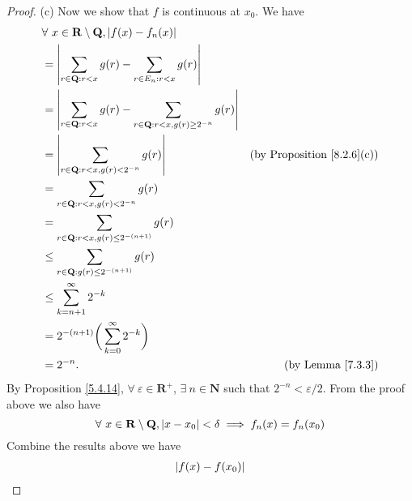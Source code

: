 \begin{proof}{(c)}
    Now we show that \(f\) is continuous at \(x_0\).
    We have
    \begin{align*}
         & \forall\ x \in \mathbf{R} \setminus \mathbf{Q}, \abs*{f(x) - f_n(x)}                                                                            \\
         & = \abs*{\sum_{r \in \mathbf{Q} : r < x} g(r) - \sum_{r \in E_n : r < x} g(r)}                                                                   \\
         & = \abs*{\sum_{r \in \mathbf{Q} : r < x} g(r) - \sum_{r \in \mathbf{Q} : r < x, g(r) \geq 2^{-n}} g(r)}                                          \\
         & = \abs*{\sum_{r \in \mathbf{Q} : r < x, g(r) < 2^{-n}} g(r)}                                           & \text{(by Proposition \ref{8.2.6}(c))} \\
         & = \sum_{r \in \mathbf{Q} : r < x, g(r) < 2^{-n}} g(r)                                                                                           \\
         & = \sum_{r \in \mathbf{Q} : r < x, g(r) \leq 2^{-(n + 1)}} g(r)                                                                                  \\
         & \leq \sum_{r \in \mathbf{Q} : g(r) \leq 2^{-(n + 1)}} g(r)                                                                                      \\
         & \leq \sum_{k = n + 1}^\infty 2^{-k}                                                                                                             \\
         & = 2^{-(n + 1)} \bigg(\sum_{k = 0}^\infty 2^{-k}\bigg)                                                                                           \\
         & = 2^{-n}.                                                                                              & \text{(by Lemma \ref{7.3.3})}
    \end{align*}
    By Proposition \ref{5.4.14}, \(\forall\ \varepsilon \in \mathbf{R}^+\), \(\exists\ n \in \mathbf{N}\) such that \(2^{-n} < \varepsilon / 2\).
    From the proof above we also have
    \[
        \forall\ x \in \mathbf{R} \setminus \mathbf{Q}, \abs*{x - x_0} < \delta \implies f_n(x) = f_n(x_0) \\
    \]
    Combine the results above we have
    \begin{align*}
         & \abs*{f(x) - f(x_0)}                               \\

\end{align*}
\end{proof}
